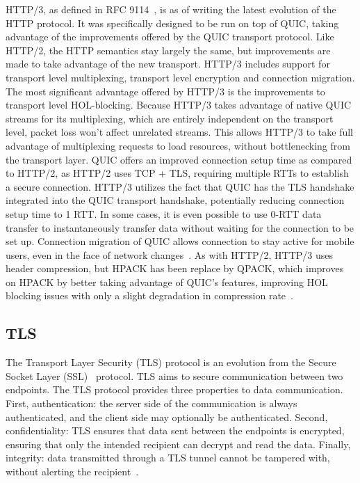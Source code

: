 \documentclass[english, 12pt, a4paper, elec, utf8, a-2b, online]{aaltothesis}
\begin{document}
HTTP/3, as defined in RFC 9114~\cite{rfc9114}, is as of writing the latest evolution
of the HTTP protocol. It was specifically designed to be run on top of QUIC,
taking advantage of the improvements offered by the QUIC transport protocol. Like HTTP/2,
the HTTP semantics stay largely the same, but improvements are made to take advantage
of the new transport. HTTP/3 includes support for transport level multiplexing,
transport level encryption and connection migration. The most significant advantage
offered by HTTP/3 is the improvements to transport level HOL-blocking. Because HTTP/3
takes advantage of native QUIC streams for its multiplexing, which are entirely independent
on the transport level, packet loss won't affect unrelated streams. This allows
HTTP/3 to take full advantage of multiplexing requests to load resources, without
bottlenecking from the transport layer. QUIC offers an improved connection setup
time as compared to HTTP/2, as HTTP/2 uses TCP + TLS, requiring multiple RTTs to
establish a secure connection. HTTP/3 utilizes the fact that QUIC has the TLS
handshake integrated into the QUIC transport handshake, potentially reducing
connection setup time to 1 RTT. In some cases, it is even possible to use 0-RTT
data transfer to instantaneously transfer data without waiting for the connection
to be set up. Connection migration of QUIC allows connection to stay active for mobile
users, even in the face of network changes~\cite{rfc9114}. As with HTTP/2, HTTP/3 uses header compression,
but HPACK has been replace by QPACK, which improves on HPACK by better taking advantage
of QUIC's features, improving HOL blocking issues with only a slight degradation
in compression rate~\cite{rfc9204}.


\subsection{TLS}
\label{sec:tls}
The Transport Layer  Security (TLS) protocol is an evolution from the Secure Socket Layer (SSL)~\cite{rfc6101} protocol.
TLS aims to secure communication between two endpoints. The TLS protocol provides three
properties to data communication. First, authentication: the server side of the
communication is always authenticated, and the client side may optionally be
authenticated. Second, confidentiality: TLS ensures that data sent between the
endpoints is encrypted, ensuring that only the intended recipient can
decrypt and read the data. Finally, integrity: data transmitted through
a TLS tunnel cannot be tampered with, without alerting the recipient~\cite{rfc8446}.
\end{document}
